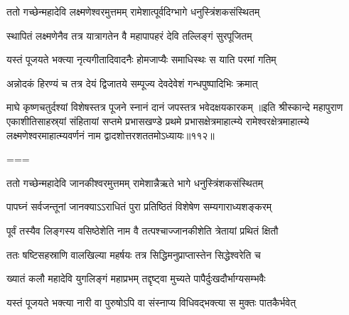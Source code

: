 \storymeta





\twolineshloka
{ततो गच्छेन्महादेवि लक्ष्मणेश्वरमुत्तमम्}
{रामेशात्पूर्वदिग्भागे धनुस्त्रिंशकसंस्थितम्}%

\twolineshloka
{स्थापितं लक्ष्मणेनैव तत्र यात्रागतेन वै}
{महापापहरं देवि तल्लिङ्गं सुरपूजितम्}%

\twolineshloka
{यस्तं पूजयते भक्त्या नृत्यगीतादिवादनैः}
{होमजाप्यैः समाधिस्थः स याति परमां गतिम्}%

\twolineshloka
{अन्नोदकं हिरण्यं च तत्र देयं द्विजातये}
{सम्पूज्य देवदेवेशं गन्धपुष्पादिभिः क्रमात्}%

\twolineshloka
{माघे कृष्णचतुर्दश्यां विशेषस्तत्र पूजने}
{स्नानं दानं जपस्तत्र भवेदक्षयकारकम्}%
॥इति श्रीस्कान्दे महापुराण एकाशीतिसाहस्र्यां संहितायां सप्तमे प्रभासखण्डे प्रथमे प्रभासक्षेत्रमाहात्म्ये रामेश्वरक्षेत्रमाहात्म्ये लक्ष्मणेश्वरमाहात्म्यवर्णनं नाम द्वादशोत्तरशततमोऽध्यायः॥११२॥

===


\vakta{}
\shrota{}
\tags{}
\notes{}

\storymeta





\twolineshloka
{ततो गच्छेन्महादेवि जानकीश्वरमुत्तमम्}
{रामेशान्नैऋते भागे धनुस्त्रिंशकसंस्थितम्}%

\twolineshloka
{पापघ्नं सर्वजन्तूनां जानक्याऽऽराधितं पुरा}
{प्रतिष्ठितं विशेषेण सम्यगाराध्यशङ्करम्}%

\twolineshloka
{पूर्वं तस्यैव लिङ्गस्य वसिष्ठेशेति नाम वै}
{तत्पश्चाज्जानकीशेति त्रेतायां प्रथितं क्षितौ}%

\twolineshloka
{ततः षष्टिसहस्राणि वालखिल्या महर्षयः}
{तत्र सिद्धिमनुप्राप्तास्तेन सिद्धेश्वरेति च}%

\twolineshloka
{ख्यातं कलौ महादेवि युगलिङ्गं महाप्रभम्}
{तद्दृष्ट्वा मुच्यते पापैर्दुःखदौर्भाग्यसम्भवैः}%

\twolineshloka
{यस्तं पूजयते भक्त्या नारी वा पुरुषोऽपि वा}
{संस्नाप्य विधिवद्भक्त्या स मुक्तः पातकैर्भवेत्}%

